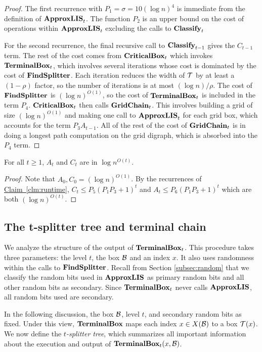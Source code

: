 \documentclass{acmsmall}
\newcommand{\cB}{{\cal B}}
\newcommand{\cT}{{\cal T}}
\newcommand{\Clm}[1]{\hyperref[clm:#1]{Claim~\ref*{clm:#1}}} %
\newcommand{\terminalbox}{{\rm{\bf TerminalBox}}}
\newcommand{\ssz}{\sigma}
\newcommand{\classify}{{\rm {\bf Classify}}}
\newcommand{\approxlis}{{\rm {\bf ApproxLIS}}}
\newcommand{\critbox}{{\rm {\bf CriticalBox}}}
\newcommand{\findsplitter}{{\rm {\bf FindSplitter}}}
\newcommand{\gridchain}{{\rm {\bf GridChain}}}
\begin{document}
\begin{proof} The first recurrence with $P_1=\ssz=10(\log n)^4$ is immediate from the definition of 
$\approxlis_t$.  The function $P_2$ is an upper bound on the cost of operations within $\approxlis_t$ excluding the calls to $\classify_t$

For the second recurrence, the final recursive call to $\classify_{t-1}$  gives the $C_{t-1}$ term.
The rest of the cost comes from  $\critbox_t$ which invokes $\terminalbox_t$, which involves several iterations
whose cost is dominated by the cost of $\findsplitter$.  Each iteration reduces the width of $\cT$ by at least a $(1-\rho)$ 
factor, so the number of iterations is at most $(\log n)/\rho$.  The cost of $\findsplitter$ is $(\log n)^{O(1)}$,
so the cost of $\terminalbox_t$ is included in the term $P_4$.  $\critbox_t$ then calls $\gridchain_t$.  This involves building a grid of
size $(\log n)^{O(1)}$ and making one call to $\approxlis_t$ for each grid box, which accounts for the term $P_3 A_{t-1}$.  All of the rest
of the cost of $\gridchain_t$ is in doing a longest path computation on the grid digraph, which is absorbed into the $P_4$ term.  
\end{proof}

\begin{corollary} \label{cor:runtime} For all $t \geq 1$, $A_t$ and $C_t$ are in $\log n^{O(t)}$.
\end{corollary}

\begin{proof} Note that $A_0, C_0 = (\log n)^{O(1)}$. By the recurrences of \Clm{runtime},
$C_t \leq P_5(P_1P_3+1)^t$ and $A_t \leq P_6(P_1P_3+1)^t$  which are both $(\log n)^{O(t)}$.
\end{proof}


\subsection{The t-splitter tree and terminal chain}
\label{sec:terminal}

We analyze the structure of the output of $\terminalbox_t$.
This procedure takes three parameters: the level $t$, the box $\cB$ and an index $x$.
It also uses randomness within the calls to $\findsplitter$. 
 Recall from Section \ref{subsec:random} that we classify the random bits used in $\approxlis$ as primary random bits
and all other random bits as secondary. Since $\terminalbox_t$ never calls $\approxlis$, all random bits used are secondary.

In the following discussion, the box $\cB$, level $t$, and secondary
random bits as fixed. Under this view, $\terminalbox$ maps each index $x \in X(\cB)$
to a box $\cT(x)$.   
We now define the {\em $t$-splitter tree}, which summarizes all important information
about the execution and output of $\terminalbox_t(x,\cB)$.
\end{document}
